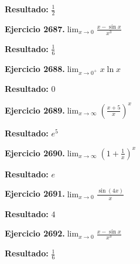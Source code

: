 \documentclass[10pt,a4paper]{article}
\begin{document}
\begin{solbox}
\textbf{Resultado:} \(\displaystyle \frac{1}{2}\)
\end{solbox}

\begin{ejbox}
\textbf{Ejercicio 2687.}\quad $\lim_{x\to 0} \frac{x-\sin x}{x^3}$
\end{ejbox}

\begin{solbox}
\textbf{Resultado:} \(\displaystyle \frac{1}{6}\)
\end{solbox}

\newpage
\begin{ejbox}
\textbf{Ejercicio 2688.}\quad $\lim_{x\to 0^+} x\ln x$
\end{ejbox}

\begin{solbox}
\textbf{Resultado:} \(\displaystyle 0\)
\end{solbox}

\begin{ejbox}
\textbf{Ejercicio 2689.}\quad $\lim_{x\to \infty} \left(\frac{x+5}{x}\right)^{x}$
\end{ejbox}

\begin{solbox}
\textbf{Resultado:} \(\displaystyle e^{5}\)
\end{solbox}

\begin{ejbox}
\textbf{Ejercicio 2690.}\quad $\lim_{x\to \infty} \left(1+\frac{1}{x}\right)^x$
\end{ejbox}

\begin{solbox}
\textbf{Resultado:} \(\displaystyle e\)
\end{solbox}

\newpage
\begin{ejbox}
\textbf{Ejercicio 2691.}\quad $\lim_{x\to 0} \frac{\sin(4x)}{x}$
\end{ejbox}

\begin{solbox}
\textbf{Resultado:} \(\displaystyle 4\)
\end{solbox}

\begin{ejbox}
\textbf{Ejercicio 2692.}\quad $\lim_{x\to 0} \frac{x-\sin x}{x^3}$
\end{ejbox}

\begin{solbox}
\textbf{Resultado:} \(\displaystyle \frac{1}{6}\)
\end{solbox}
\end{document}
